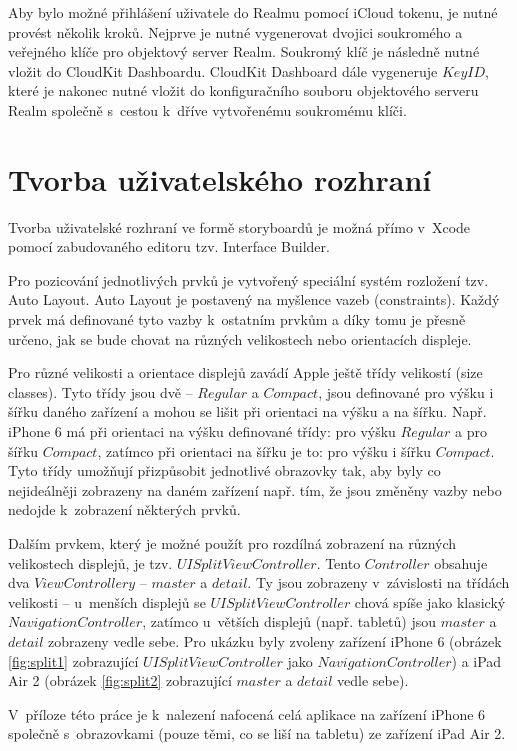 \documentclass[thesis=M,czech]{FITthesis}[2012/06/26]
\begin{document}
Aby bylo možné přihlášení uživatele do Realmu pomocí iCloud tokenu, je nutné provést několik kroků. Nejprve je nutné vygenerovat dvojici soukromého a veřejného klíče pro objektový server Realm. Soukromý klíč je následně nutné vložit do CloudKit Dashboardu. CloudKit Dashboard dále vygeneruje $Key ID$, které je nakonec nutné vložit do konfiguračního souboru objektového serveru Realm společně s~cestou k~dříve vytvořenému soukromému klíči. \cite{realmObjS}

\section{Tvorba uživatelského rozhraní}
Tvorba uživatelské rozhraní ve formě storyboardů je možná přímo v~Xcode pomocí zabudovaného editoru tzv. Interface Builder.

Pro pozicování jednotlivých prvků je vytvořený speciální systém rozložení tzv. Auto Layout. Auto Layout je postavený na myšlence vazeb (constraints). Každý prvek má definované tyto vazby k~ostatním prvkům a díky tomu je přesně určeno, jak se bude chovat na různých velikostech nebo orientacích displeje. \cite{ib}

Pro různé velikosti a orientace displejů zavádí Apple ještě třídy velikostí (size classes). Tyto třídy jsou dvě -- $Regular$ a $Compact$, jsou definované pro výšku i šířku daného zařízení a mohou se lišit při orientaci na výšku a na šířku. Např. iPhone 6 má při orientaci na výšku definované třídy: pro výšku $Regular$ a pro šířku $Compact$, zatímco při orientaci na šířku je to: pro výšku i šířku $Compact$. Tyto třídy umožňují přizpůsobit jednotlivé obrazovky tak, aby byly co nejideálněji zobrazeny na daném zařízení např. tím, že jsou změněny vazby nebo nedojde k~zobrazení některých prvků. \cite{sizeClasses}

Dalším prvkem, který je možné použít pro rozdílná zobrazení na různých velikostech displejů, je tzv. $UISplitViewController$. Tento $Controller$ obsahuje dva $ViewControllery$ -- $master$ a $detail$. Ty jsou zobrazeny v~závislosti na třídách velikosti -- u~menších displejů se $UISplitViewController$ chová spíše jako klasický $NavigationController$, zatímco u~větších displejů (např. tabletů) jsou $master$ a $detail$ zobrazeny vedle sebe. \cite{splitVC} Pro ukázku byly zvoleny zařízení iPhone 6 (obrázek \ref{fig:split1} zobrazující $UISplitViewController$ jako $NavigationController$) a iPad Air 2 (obrázek \ref{fig:split2} zobrazující $master$ a $detail$ vedle sebe).

V~příloze této práce je k~nalezení nafocená celá aplikace na zařízení iPhone 6 společně s~obrazovkami (pouze těmi, co se liší na tabletu) ze zařízení iPad Air 2. 
\end{document}
